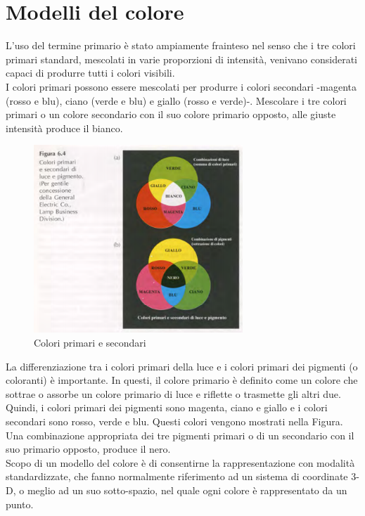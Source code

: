 \documentclass[12pt]{article}
\begin{document}
\section{Modelli del colore}
L'uso del termine primario è stato ampiamente frainteso nel senso che i
tre colori primari standard, mescolati in varie proporzioni di intensità, venivano considerati capaci di produrre tutti i colori visibili. \\
I colori primari possono essere mescolati per produrre i colori secondari -magenta (rosso e blu), ciano (verde e blu) e giallo (rosso e verde)-. Mescolare i tre colori primari o un colore secondario con il suo colore primario opposto, alle giuste intensità produce il bianco. \\
\begin{figure}[!htb]
    \centering
    \includegraphics[width=0.7\textwidth]{Images/colori.png}
    \caption{Colori primari e secondari}
\end{figure}
\FloatBarrier
La differenziazione tra i colori primari della luce e i colori primari dei pigmenti (o coloranti) è importante. In questi, il colore primario è definito come un colore che sottrae o assorbe un colore primario di luce e riflette o trasmette gli altri due. Quindi, i colori primari dei pigmenti sono magenta, ciano e giallo e i colori secondari sono rosso, verde e blu. Questi colori vengono mostrati nella Figura. Una combinazione appropriata dei tre pigmenti primari o di un secondario con il suo primario opposto, produce il nero.\\

Scopo di un modello del colore è di consentirne la rappresentazione con
modalità standardizzate, che fanno normalmente riferimento ad un sistema di coordinate 3-D, o meglio ad un suo sotto-spazio, nel quale ogni colore è rappresentato da un punto.
\end{document}
